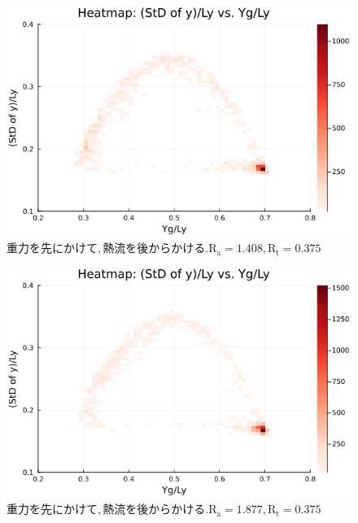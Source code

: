 \begin{figure}[H]
  \centering
  \includegraphics[scale=0.6]{image/RaRtmap_drop_heat/2023-12-21T10:44:58.471_RaRtmap_chi1.265_Ay50_rho0.4_T0.43_dT0.04_Rd0.0_Rt0.375_Ra1.4081535_g0.0003999718779659611_run4.0e7.png}
  \caption{$重力を先にかけて, 熱流を後からかける. \text{R}_\text{a}=1.408,\text{R}_\text{t}=0.375$}
  \label{}
\end{figure}

\begin{figure}[H]
  \centering
  \includegraphics[scale=0.6]{image/RaRtmap_drop_heat/2023-12-21T10:44:58.541_RaRtmap_chi1.265_Ay50_rho0.4_T0.43_dT0.04_Rd0.0_Rt0.375_Ra1.877538_g0.0003999718779659611_run4.0e7.png}
  \caption{$重力を先にかけて, 熱流を後からかける. \text{R}_\text{a}=1.877,\text{R}_\text{t}=0.375$}
  \label{}
\end{figure}

